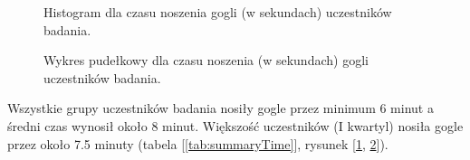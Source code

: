     \begin{figure}[H]
        \centering
        \caption{Histogram dla czasu noszenia gogli (w sekundach) uczestników badania.}
        \label{fig:histTime}
    \end{figure}

    \begin{figure}[H]
        \centering
        \caption{Wykres pudełkowy dla czasu noszenia (w sekundach) gogli uczestników badania.}
        \label{fig:boxTime}
    \end{figure}

    Wszystkie grupy uczestników badania nosiły gogle przez minimum 6 minut a średni czas wynosił około 8 minut.
    Większość uczestników (I kwartyl) nosiła gogle przez około 7.5 minuty  (tabela [\ref{tab:summaryTime}], rysunek [\ref{fig:histTime}, \ref{fig:boxTime}]).